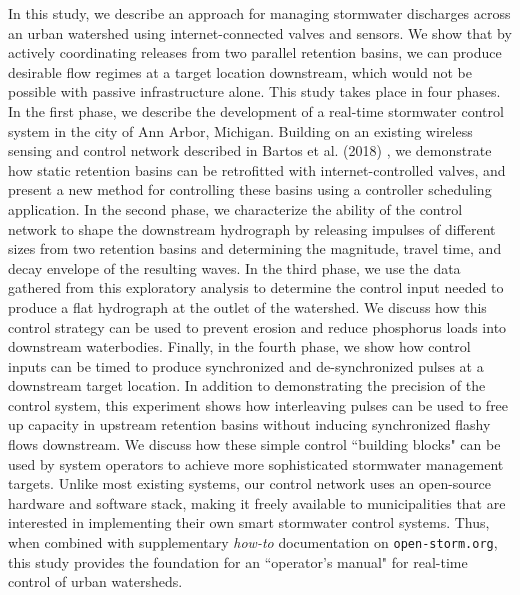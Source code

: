 In this study, we describe an approach for
managing stormwater discharges across an urban watershed using internet-connected valves and sensors.
We show that by actively coordinating releases from two parallel retention basins, we can produce desirable flow regimes at a target location downstream, which would not be possible with passive infrastructure alone.
This study takes place in four phases.
In the first phase, we describe the development of a real-time stormwater control system in the city of Ann Arbor, Michigan. Building on an existing wireless sensing and control network described in Bartos et al. (2018) \cite{Bartos_2018}, we demonstrate how static retention basins can be retrofitted with internet-controlled valves, and present a new method for controlling these basins using a controller scheduling application. In the second phase, we characterize the ability of the control network to shape the downstream hydrograph by releasing impulses of different sizes from two retention basins and determining the magnitude, travel time, and decay envelope of the resulting waves.  In the third phase, we use the data gathered from this exploratory analysis to determine the control input needed to produce a flat hydrograph at the outlet of the watershed. We discuss how this control strategy can be used to prevent erosion and reduce phosphorus loads into downstream waterbodies.
Finally, in the fourth phase, we show how control inputs can be timed to produce synchronized and de-synchronized pulses at a downstream target location. In addition to demonstrating the precision of the control system, this experiment shows how interleaving pulses can be used to free up capacity in upstream retention basins without inducing synchronized flashy flows downstream. We discuss how these simple control ``building blocks" can be used by system operators to achieve more sophisticated stormwater management targets. Unlike most existing systems, our control network uses an open-source hardware and software stack, making it freely available to municipalities that are interested in implementing their own smart stormwater control systems. Thus, when combined with supplementary \textit{how-to} documentation on \texttt{open-storm.org}, this study provides
the foundation for an ``operator's manual" for real-time control of urban watersheds.

